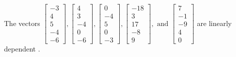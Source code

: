 \begin{exercise}
\begin{exerciseStatement}
  \end{exerciseStatement}
  \begin{exerciseAnswer}
   The vectors \(\left[\begin{array}{r}
-3 \\
4 \\
5 \\
-4 \\
-6
\end{array}\right] , \left[\begin{array}{r}
4 \\
3 \\
-4 \\
0 \\
-6
\end{array}\right] , \left[\begin{array}{r}
0 \\
-4 \\
5 \\
0 \\
-3
\end{array}\right] , \left[\begin{array}{r}
-18 \\
3 \\
17 \\
-8 \\
9
\end{array}\right] , \text{ and } \left[\begin{array}{r}
7 \\
-1 \\
-9 \\
4 \\
0
\end{array}\right]\) are 
  	 linearly dependent  .
  


  \end{exerciseAnswer}
\end{exercise}